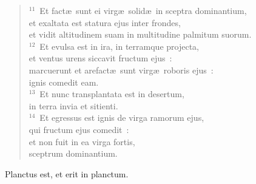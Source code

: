 \begin{flushleft}
\begin{verse}
${}^{11}$~Et fact\ae\ sunt ei virg\ae\ solid\ae\ in sceptra dominantium,\\ et exaltata est statura ejus inter frondes,\\ et vidit altitudinem suam in multitudine palmitum suorum.\\
${}^{12}$~Et evulsa est in ira, in terramque projecta,\\ et ventus urens siccavit fructum ejus~:\\ marcuerunt et arefact\ae\ sunt virg\ae\ roboris ejus~:\\ ignis comedit eam.\\
${}^{13}$~Et nunc transplantata est in desertum,\\ in terra invia et sitienti.\\
${}^{14}$~Et egressus est ignis de virga ramorum ejus,\\ qui fructum ejus comedit~:\\ et non fuit in ea virga fortis,\\ sceptrum dominantium.\end{verse}\end{flushleft}

 Planctus est, et erit in planctum.

